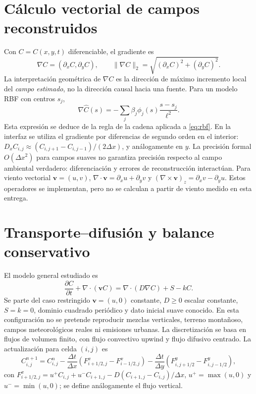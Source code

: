 \section{Cálculo vectorial de campos reconstruidos}\label{sec:vector}
Con $C=C(x,y,t)$ diferenciable, el gradiente es
\begin{equation}\nabla C=(\partial_x C,\partial_y C),\qquad \|\nabla C\|_2=\sqrt{(\partial_xC)^2+(\partial_yC)^2}.\label{eq:grad}\end{equation}
La interpretación geométrica de $\nabla C$ es la dirección de máximo incremento local del \emph{campo estimado}, no la dirección causal hacia una fuente. Para un modelo RBF con centros $s_j$,
\begin{equation}\nabla\widehat C(s)=-\sum_j\beta_j\phi_j(s)\frac{s-s_j}{\ell^2}.\label{eq:gradRBF}\end{equation}
Esta expresión se deduce de la regla de la cadena aplicada a \eqref{eq:rbf}. En la interfaz se utiliza el gradiente por diferencias de segundo orden en el interior: $D_xC_{i,j}\approx(C_{i,j+1}-C_{i,j-1})/(2\Delta x)$, y análogamente en $y$. La precisión formal $O(\Delta x^2)$ para campos suaves no garantiza precisión respecto al campo ambiental verdadero: diferenciación y errores de reconstrucción interactúan. Para viento vectorial $\boldsymbol v=(u,v)$, $\nabla\cdot\boldsymbol v=\partial_xu+\partial_yv$ y $(\nabla\times\boldsymbol v)_z=\partial_xv-\partial_yu$. Estos operadores se implementan, pero no se calculan a partir de viento medido en esta entrega.

\section{Transporte--difusión y balance conservativo}\label{sec:pde}
El modelo general estudiado es
\begin{equation}\frac{\partial C}{\partial t}+\nabla\cdot(\boldsymbol v C)=\nabla\cdot(D\nabla C)+S-kC.\label{eq:edp}\end{equation}
Se parte del caso restringido $\boldsymbol v=(u,0)$ constante, $D\geq0$ escalar constante, $S=k=0$, dominio cuadrado periódico y dato inicial suave conocido. En esta configuración no se pretende reproducir mezclas verticales, terreno montañoso, campos meteorológicos reales ni emisiones urbanas. La discretización se basa en flujos de volumen finito, con flujo convectivo upwind y flujo difusivo centrado. La actualización para celda $(i,j)$ es
\begin{equation}C_{i,j}^{n+1}=C_{i,j}^n-\frac{\Delta t}{\Delta x}(F^x_{i+1/2,j}-F^x_{i-1/2,j})-\frac{\Delta t}{\Delta y}(F^y_{i,j+1/2}-F^y_{i,j-1/2}),\label{eq:fv}\end{equation}
con $F^x_{i+1/2,j}=u^+ C_{i,j}+u^- C_{i+1,j}-D(C_{i+1,j}-C_{i,j})/\Delta x$, $u^+=\max(u,0)$ y $u^-=\min(u,0)$; se define análogamente el flujo vertical.

